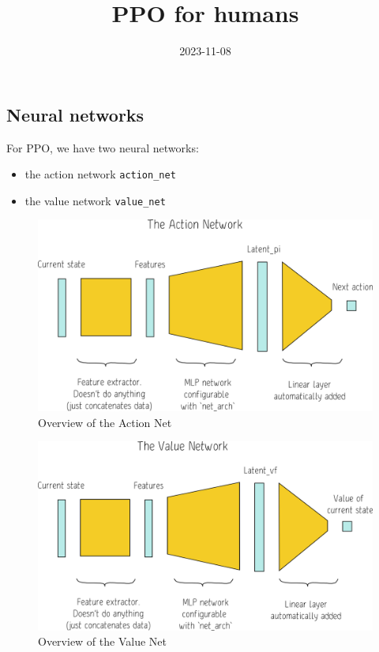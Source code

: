 \documentclass[
  letterpaper,
  DIV=11,
  numbers=noendperiod]{scrartcl}
\title{PPO for humans}
\author{}
\date{2023-11-08}
\providecommand{\tightlist}{%
  \setlength{\itemsep}{0pt}\setlength{\parskip}{0pt}}\usepackage{longtable,booktabs,array}
\renewcommand*\contentsname{Table of contents}
\newcommand\contentsname{Table of contents}
\begin{document}
\maketitle

\renewcommand*\contentsname{Table of contents}
{
\hypersetup{linkcolor=}
\setcounter{tocdepth}{3}
\tableofcontents
}
\subsection{Neural networks}\label{neural-networks}

For PPO, we have two neural networks:

\begin{itemize}
\tightlist
\item
  the action network \texttt{action\_net}
\item
  the value network \texttt{value\_net}
\end{itemize}

\begin{figure}[H]

{\centering \includegraphics{img/ActionNet.png}

}

\caption{Overview of the Action Net}

\end{figure}%

\hfill\break

\begin{figure}[H]

{\centering \includegraphics{img/ValueNet.png}

}

\caption{Overview of the Value Net}

\end{figure}%
\end{document}
